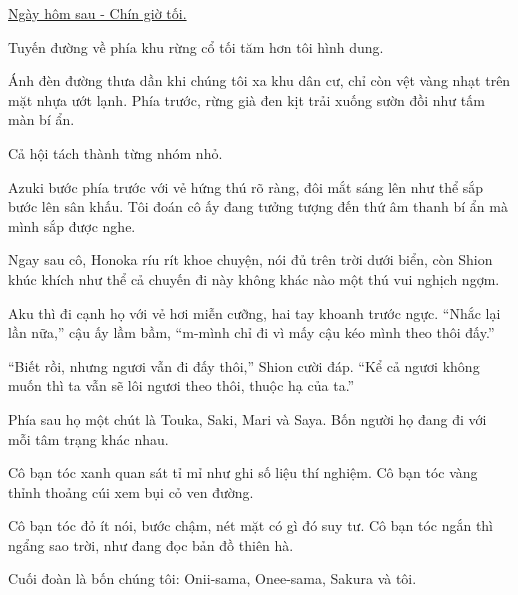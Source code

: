 \documentclass[../main.tex]{subfiles}
\begin{document}

\begin{center}
  \uline{Ngày hôm sau - Chín giờ tối.}
\end{center}

Tuyến đường về phía khu rừng cổ tối tăm hơn tôi hình dung.

Ánh đèn đường thưa dần khi chúng tôi xa khu dân cư, chỉ còn vệt vàng nhạt trên mặt nhựa ướt lạnh. Phía trước, rừng già đen kịt trải xuống sườn đồi như tấm màn bí ẩn.

Cả hội tách thành từng nhóm nhỏ.

Azuki bước phía trước với vẻ hứng thú rõ ràng, đôi mắt sáng lên như thể sắp bước lên sân khấu. Tôi đoán cô ấy đang tưởng tượng đến thứ âm thanh bí ẩn mà mình sắp được nghe.

Ngay sau cô, Honoka ríu rít khoe chuyện, nói đủ trên trời dưới biển, còn Shion khúc khích như thể cả chuyến đi này không khác nào một thú vui nghịch ngợm.

Aku thì đi cạnh họ với vẻ hơi miễn cưỡng, hai tay khoanh trước ngực. ``Nhắc lại lần nữa,'' cậu ấy lầm bầm, ``m-mình chỉ đi vì mấy cậu kéo mình theo thôi đấy.''

``Biết rồi, nhưng ngươi vẫn đi đấy thôi,'' Shion cười đáp. ``Kể cả ngươi không muốn thì ta vẫn sẽ lôi ngươi theo thôi, thuộc hạ của ta.''

Phía sau họ một chút là Touka, Saki, Mari và Saya. Bốn người họ đang đi với mỗi tâm trạng khác nhau.

Cô bạn tóc xanh quan sát tỉ mỉ như ghi số liệu thí nghiệm. Cô bạn tóc vàng thỉnh thoảng cúi xem bụi cỏ ven đường.

Cô bạn tóc đỏ ít nói, bước chậm, nét mặt có gì đó suy tư. Cô bạn tóc ngắn thì ngẩng sao trời, như đang đọc bản đồ thiên hà.

Cuối đoàn là bốn chúng tôi: Onii-sama, Onee-sama, Sakura và tôi.
\end{document}
